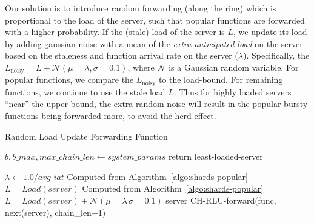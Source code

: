Our solution is to introduce random forwarding (along the ring) which is proportional to the load of the server, such that popular functions are forwarded with a higher probability. 
If the (stale) load of the server is $L$, we update its load by adding gaussian noise with a mean of the \emph{extra anticipated load} on the server based on the staleness and function arrival rate on the server ($\lambda$).
Specifically, the $L_{\text{noisy}}=L+\mathcal{N}(\mu=\lambda, \sigma=0.1)$, where $\mathcal{N}$ is a Gaussian random variable. 
For popular functions, we  compare the $L_{\text{noisy}}$ to the load-bound.
For remaining functions, we continue to use the stale load $L$. 
Thus for highly loaded servers ``near'' the upper-bound, the extra random noise will result in the popular bursty functions being forwarded more, to avoid the herd-effect.

\begin{comment}
To achieve this, we introduce Gaussian noise to the forwarding decision.
We compute the global arrival rate, then estimate the per-server arrival rate and the effect an invocation has on server load, following the steps in Algorithm~\ref{algo:PopularRLUPolicy}.
For each server we then sample noise from the normal distribution whos mean is centered on the \textit{extra\_anticip\_load}, and add that to the server's tracked load to get \textit{Lnoise}.
We iterate along the ring of servers until we find one with a \textit{Lnoise} less than the global \textit{bounded\_ceil}.
In the case where we skip over 3 servers, we assume that the invocation will run cold no matter what, and assign it to the least loaded server.
\end{comment}


\begin{algorithm}
  \caption{Random Load Update Forwarding Function}
  \begin{algorithmic}[1]
    \State $b, b\_max, max\_chain\_len \gets system\_params $
    \State return least-loaded-server
    \EndIf 

    \State $\lambda \gets 1.0 / avg\_iat$ \Comment Computed from Algorithm~\ref{algo:shards-popular}
     \State $L=Load(server)$
     \Comment Computed from Algorithm~\ref{algo:shards-popular}
         \State $L = Load(server) + \mathcal{N}(\mu=\lambda\,\sigma=0.1)$
    \EndIf 
       \State server
    \Else \State CH-RLU-forward(func, next(server), chain\_len+1)
    \EndIf
    \EndProcedure
    \end{algorithmic}
\label{algo:PopularRLUPolicy}
\end{algorithm}

